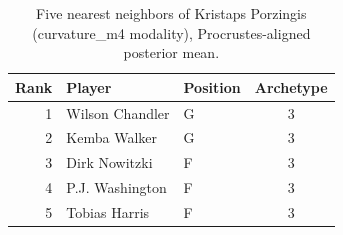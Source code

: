 \begin{table}[htbp]
  \centering\small
  \begin{tabular}{rllc}
    \toprule
    Rank & Player & Position & Archetype \\
    \midrule
    1 & Wilson Chandler & G & 3 \\
    2 & Kemba Walker & G & 3 \\
    3 & Dirk Nowitzki & F & 3 \\
    4 & P.J. Washington & F & 3 \\
    5 & Tobias Harris & F & 3 \\
    \bottomrule
  \end{tabular}
  \caption{Five nearest neighbors of Kristaps Porzingis (curvature_m4 modality), Procrustes-aligned posterior mean.}
  \label{tab:Kristaps_Porzingis_neighbors_curvature_m4}
\end{table}

